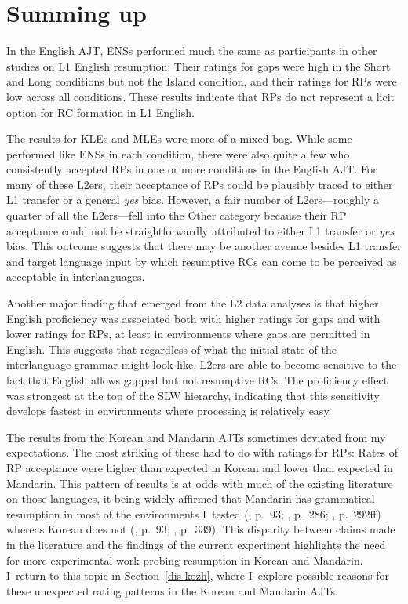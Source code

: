 \section{Summing up}\label{ajt-conclusion}

In the English AJT, ENSs performed much the same as participants in other studies on L1 English resumption: Their ratings for gaps were high in the Short and Long conditions but not the Island condition, and their ratings for RPs were low across all conditions. These results indicate that RPs do not represent a licit option for RC formation in L1 English. 

The results for KLEs and MLEs were more of a mixed bag. While some performed like ENSs in each condition, there were also quite a few who consistently accepted RPs in one or more conditions in the English AJT. For many of these L2ers, their acceptance of RPs could be plausibly traced to either L1 transfer or a general \textit{yes} bias. However, a fair number of L2ers---roughly a quarter of all the L2ers---fell into the Other category because their RP acceptance could not be straightforwardly attributed to either L1 transfer or \textit{yes} bias. This outcome suggests that there may be another avenue besides L1 transfer and target language input by which resumptive RCs can come to be perceived as acceptable in interlanguages.

Another major finding that emerged from the L2 data analyses is that higher English proficiency was associated both with higher ratings for gaps and with lower ratings for RPs, at least in environments where gaps are permitted in English. This suggests that regardless of what the initial state of the interlanguage grammar might look like, L2ers are able to become sensitive to the fact that English allows gapped but not resumptive RCs. The proficiency effect was strongest at the top of the SLW hierarchy, indicating that this sensitivity develops fastest in environments where processing is relatively easy.

The results from the Korean and Mandarin AJTs sometimes deviated from my expectations. The most striking of these had to do with ratings for RPs: Rates of RP acceptance were higher than expected in Korean and lower than expected in Mandarin. This pattern of results is at odds with much of the existing literature on those languages, it being widely affirmed that Mandarin has grammatical resumption in most of the environments I~tested (\cite{keenan.comrie1977}, p.~93; \cite{li.wei2014}, p.~286; \cite{pan2016}, p.~292ff) whereas Korean does not (\cite{keenan.comrie1977}, p.~93; \cite{han2013}, p.~339). This disparity between claims made in the literature and the findings of the current experiment highlights the need for more experimental work probing resumption in Korean and Mandarin. I~return to this topic in Section~\ref{dis-kozh}, where I~explore possible reasons for these unexpected rating patterns in the Korean and Mandarin AJTs.

